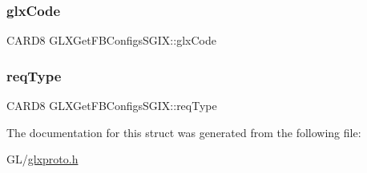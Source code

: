 \subsubsection{\texorpdfstring{glx\+Code}{glxCode}}
{\footnotesize\ttfamily C\+A\+R\+D8 G\+L\+X\+Get\+F\+B\+Configs\+S\+G\+I\+X\+::glx\+Code}

\mbox{\label{struct_g_l_x_get_f_b_configs_s_g_i_x_a2a47343208cb882772680ea25460c220}} 
\subsubsection{\texorpdfstring{req\+Type}{reqType}}
{\footnotesize\ttfamily C\+A\+R\+D8 G\+L\+X\+Get\+F\+B\+Configs\+S\+G\+I\+X\+::req\+Type}



The documentation for this struct was generated from the following file\+:\begin{DoxyCompactItemize}
\item 
G\+L/\hyperlink{glxproto_8h}{glxproto.\+h}\end{DoxyCompactItemize}
